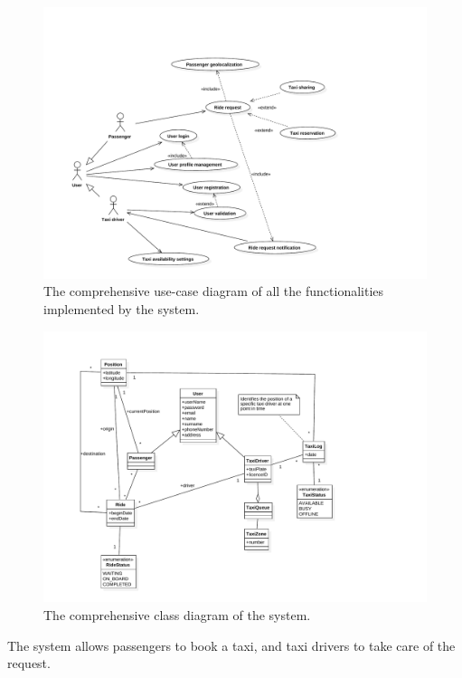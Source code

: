 \begin{figure}
\includegraphics[width=\textwidth]{diagrams/usecase_whole.pdf}
\caption{The comprehensive use-case diagram of all the functionalities implemented by the system.}
\end{figure}

\begin{figure}
\includegraphics[width=\textwidth]{diagrams/general_class_diagram.pdf}
\caption{The comprehensive class diagram of the system.}
\end{figure}
The system allows passengers to book a taxi, and taxi drivers to take care of the request.

